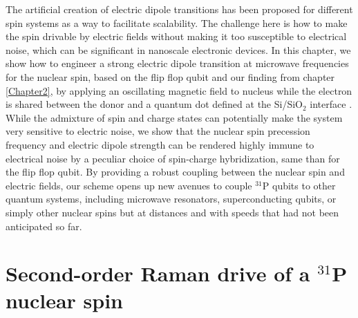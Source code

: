 The artificial creation of electric dipole transitions has been proposed for different spin systems \cite{Pioro-Ladriere2008,Shi2012,Russ2017,Salfi2016,Tosi2017} as a way to facilitate scalability. The challenge here is how to make the spin drivable by electric fields without making it too susceptible to electrical noise, which can be significant in nanoscale electronic devices. In this chapter, we show how to engineer a strong electric dipole transition at microwave frequencies for the nuclear spin, based on the flip flop qubit and our finding from chapter \ref{Chapter2}, by applying an oscillating magnetic field to nucleus while the electron is shared between the donor and a quantum dot defined at the Si/SiO$_2$ interface \cite{Calderon2006,Veldhorst2014, Tosi2017,Harvey-Collard2017}. While the admixture of spin and charge states can potentially make the system very sensitive to electric noise, we show that the nuclear spin precession frequency and electric dipole strength can be rendered highly immune to electrical noise by a peculiar choice of spin-charge hybridization, same than for the flip flop qubit. By providing a robust coupling between the nuclear spin and electric fields, our scheme opens up new avenues to couple $^{31}$P qubits to other quantum systems, including microwave resonators, superconducting qubits, or simply other nuclear spins but at distances and with speeds that had not been anticipated so far.


\section{Second-order Raman drive of a $^{31}$P nuclear spin} \label{sec:Raman}


